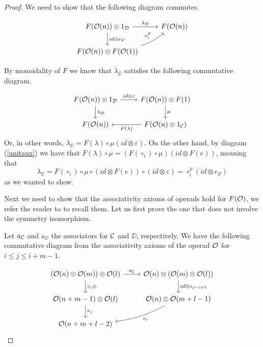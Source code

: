 \documentclass[Thesis.tex]{subfiles}
\begin{document}
\begin{proof}
We need to show that the following diagram commutes.

  \[
 \begin{tikzcd}
F( \OO(n))\otimes 1_\DD\arrow[r, "\lambda_\DD"]\arrow[d, "id\otimes e_F"] &  F(\OO(n)) \\
 F(\OO(n))\otimes F(\OO(1))\arrow[ur, bend right = 10, "\circ_i^F"]&
 \end{tikzcd}
 \]
 
% 
 By monoidality of $F$ we know that $\lambda_\DD$ satisfies the following commutative diagram.
 
 \[
 \begin{tikzcd}
 F(\OO(n))\otimes 1_\DD\arrow[d, "\lambda_\DD"]\arrow[r, "id\otimes \varepsilon"] & F(\OO(n))\otimes F(1)\arrow[d,"\mu"]\\
 F(\OO(n)) & F(\OO(n)\otimes 1_\CC)\arrow[l, "F(\lambda)"]
 \end{tikzcd}
 \]
 Or, in other words, $\lambda_\DD = F(\lambda)\circ \mu(id\otimes \varepsilon)$.  On the other hand, by diagram (\ref{unitaux}) we have that $F(\lambda)\circ \mu = (F(\circ_i)\circ \mu)(id\otimes F(e))$, meaning that
 \[\lambda_\DD =  F(\circ_i)\circ \mu\circ (id\otimes F(e))\circ (id\otimes \varepsilon) = \circ_i^F(id\otimes  e_F)\]
 as we wanted to show.
 
 Next we need to show that the associativity axioms of operads hold for $F({\mathcal O})$, we refer the reader to \cite[\S 1.1.2]{ward} to recall them. Let us first prove the one that does not involve the symmetry isomorphism. 
 
 Let $a_{\mathcal C}$ and $a_\DD$ the associators for ${\mathcal C}$ and $\DD$, respectively. We have the following commutative diagram from the associativity axioms of the operad ${\mathcal O}$ for $i\leq j\leq i+m-1$.
 
 \[
\begin{tikzcd}
(\OO(n)\otimes \OO(m))\otimes \OO(l) \arrow[r, "a_\CC"]\arrow[d, "\circ_i\otimes"] & \OO(n)\otimes (\OO(m)\otimes\OO(l))\arrow[d, "id\otimes\circ_{j-i+1}"]\\
\OO(n+m-1)\otimes\OO(l)\arrow[d, "\circ_j"] & \OO(n)\otimes\OO(m+l-1)\arrow[dl, bend left = 10, "\circ_i"]\\
\OO(n+m+l-2) & 
\end{tikzcd} 
 \]
 

\end{proof}
\end{document}
